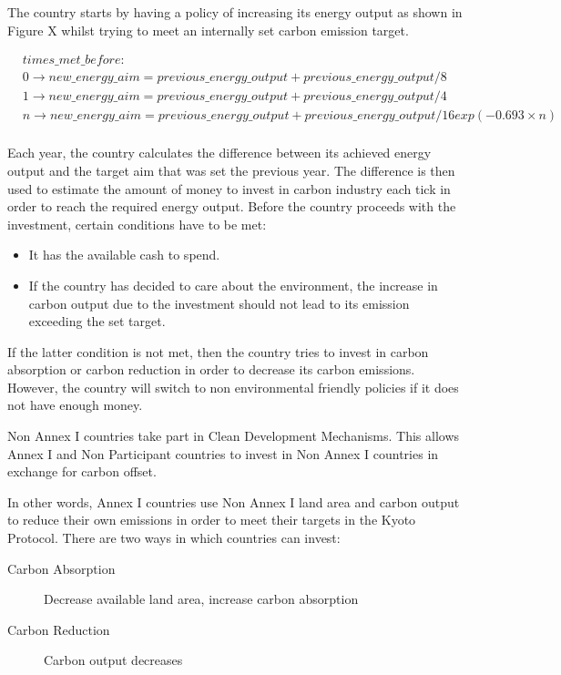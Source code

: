 The country starts by having a policy of increasing its energy output as shown in Figure X whilst trying to meet an internally set carbon emission target.

%
% 

\begin{align*}
	&times\_met\_before: \\
	&0 \rightarrow new\_energy\_aim = previous\_energy\_output + previous\_energy\_output / 8\\
	&1 \rightarrow new\_energy\_aim = previous\_energy\_output + previous\_energy\_output / 4\\
	&n \rightarrow new\_energy\_aim = previous\_energy\_output + previous\_energy\_output / 16exp(-0.693 \times n)\\
\end{align*}

Each year, the country calculates the difference between its achieved energy output and the target aim that was set the previous year. The difference is then used to estimate the amount of money to invest in carbon industry each tick in order to reach the required energy output. Before the country proceeds with the investment, certain conditions have to be met:

\begin{itemize}
	\item It has the available cash to spend.
	\item If the country has decided to care about the environment, the increase in carbon output due to the investment should not lead to its emission exceeding the set target.
\end{itemize}

If the latter condition is not met, then the country tries to invest in carbon absorption or carbon reduction in order to decrease its carbon emissions. However, the country will switch to non environmental friendly policies if it does not have enough money.
 
Non Annex I countries take part in Clean Development Mechanisms. This allows Annex I and Non Participant countries to invest in Non Annex I countries in exchange for carbon offset.

In other words, Annex I countries use Non Annex I land area and carbon output to reduce their own emissions in order to meet their targets in the Kyoto Protocol. There are two ways in which countries can invest:
 
\begin{description}
	\item[Carbon Absorption] Decrease available land area, increase carbon absorption
	\item[Carbon Reduction] Carbon output decreases
\end{description}
 
